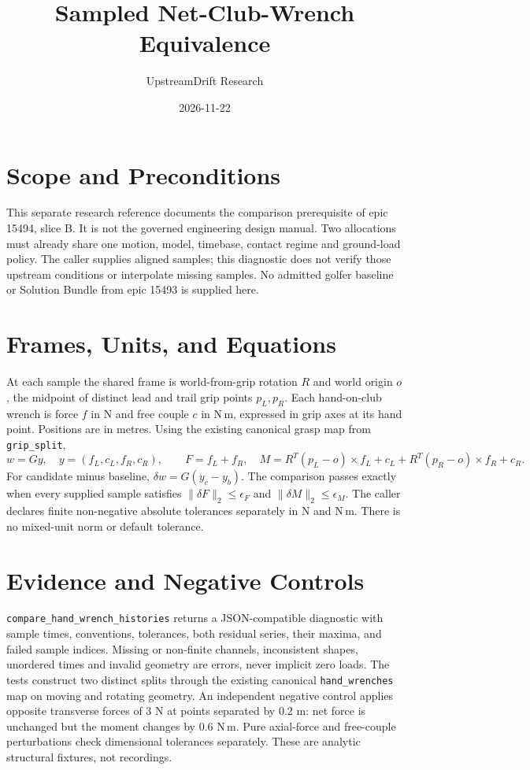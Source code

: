 \documentclass{article}
\title{Sampled Net-Club-Wrench Equivalence}
\author{UpstreamDrift Research}
\date{2026-11-22}
\begin{document}
\maketitle
\section{Scope and Preconditions}
This separate research reference documents the comparison prerequisite of
epic 15494, slice B. It is not the governed engineering design manual.
Two allocations must already share one motion, model, timebase, contact regime
and ground-load policy. The caller supplies aligned samples; this diagnostic
does not verify those upstream conditions or interpolate missing samples.
No admitted golfer baseline or Solution Bundle from epic 15493 is supplied here.

\section{Frames, Units, and Equations}
At each sample the shared frame is world-from-grip rotation $R$ and world
origin $o$, the midpoint of distinct lead and trail grip points $p_L,p_R$.
Each hand-on-club wrench is force $f$ in N and free couple $c$ in N\,m,
expressed in grip axes at its hand point. Positions are in metres.
Using the existing canonical grasp map from \texttt{grip\_split},
\[
 w=Gy,\quad y=(f_L,c_L,f_R,c_R),\qquad
 F=f_L+f_R,\quad
 M=R^T(p_L-o)\times f_L+c_L+R^T(p_R-o)\times f_R+c_R.
\]
For candidate minus baseline, $\delta w=G(y_c-y_b)$.
The comparison passes exactly when every supplied sample satisfies
$\|\delta F\|_2\leq\epsilon_F$ and
$\|\delta M\|_2\leq\epsilon_M$.
The caller declares finite non-negative absolute tolerances separately in
N and N\,m. There is no mixed-unit norm or default tolerance.

\section{Evidence and Negative Controls}
\texttt{compare\_hand\_wrench\_histories} returns a JSON-compatible diagnostic
with sample times, conventions, tolerances, both residual series, their maxima,
and failed sample indices. Missing or non-finite channels, inconsistent shapes,
unordered times and invalid geometry are errors, never implicit zero loads.
The tests construct two distinct splits through the existing canonical
\texttt{hand\_wrenches} map on moving and rotating geometry.
An independent negative control applies opposite transverse forces of 3 N
at points separated by 0.2 m: net force is unchanged but the moment changes
by 0.6 N\,m. Pure axial-force and free-couple perturbations check dimensional
tolerances separately. These are analytic structural fixtures, not recordings.
\end{document}
